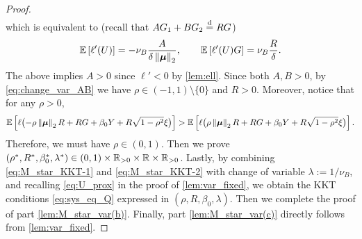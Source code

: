 \begin{proof}
\begin{align*}
    \end{align*}
    which is equivalent to (recall that $A G_1 + B G_2 \overset{\smash{\mathrm{d}}}{=} R G$)
    \begin{equation}
    \label{eq:M_star_KKT-2}
        \mathbb{E} \left[ \ell'(U) \right] = -\nu_B \frac{A}{\delta\left\|{\text{\boldmath $\mu$}}\right\|_2},
        \qquad
        \mathbb{E} \left[ \ell'(U) G \right] = \nu_B \frac{R}{\delta}.
    \end{equation}
    The above implies $A > 0$ since $\ell' < 0$ by \cref{lem:ell}. Since both $A, B > 0$, by \cref{eq:change_var_AB} we have $\rho \in (-1, 1) \setminus \{ 0 \}$ and $R > 0$. Moreover, notice that for any $\rho > 0$,
    \begin{equation*}
        \mathbb{E} \left[ \ell \bigl( -\rho\left\|{{\boldsymbol{\mu}}}\right\|_2 R + RG + \beta_0 Y + R\sqrt{1 - \rho^2} \xi \bigr) \right]
        >
        \mathbb{E} \left[ \ell \bigl( \rho\left\|{{\boldsymbol{\mu}}}\right\|_2 R + RG + \beta_0 Y + R\sqrt{1 - \rho^2} \xi \bigr) \right].
    \end{equation*}
    Therefore, we must have $\rho \in (0, 1)$. Then we prove $(\rho^*, R^*, \beta_0^*, \lambda^*) \in (0, 1) \times \mathbb{R}_{>0} \times \mathbb{R} \times \mathbb{R}_{> 0}$. Lastly, by combining \cref{eq:M_star_KKT-1} and \eqref{eq:M_star_KKT-2} with change of variable $\lambda := 1/\nu_B$, and recalling \cref{eq:U_prox} in the proof of \cref{lem:var_fixed}, we obtain the KKT conditions \cref{eq:sys_eq_Q} expressed in $(\rho, R, \beta_0, \lambda)$. Then we complete the proof of part \ref{lem:M_star_var(b)}. Finally, part \ref{lem:M_star_var(c)} directly follows from \cref{lem:var_fixed}.

\end{proof}
